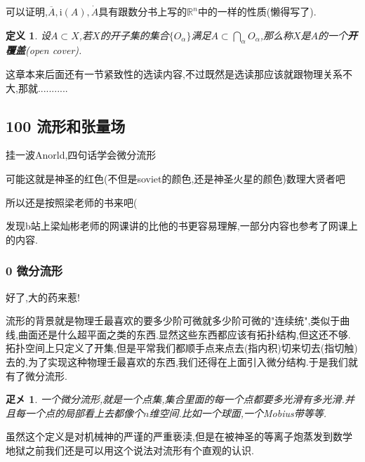 \documentclass[UTF8]{article}
\newcommand{\im}{\mathrm{i}}
\begin{document}
	可以证明,$\overline{A}, \im(A), \dot{A}$具有跟数分书上写的$\mathbb{R}^n$中的一样的性质(懒得写了).
	
	\newtheorem*{openCover}{定义}
	
	\begin{openCover}
		设$A \subset X$,若$X$的开子集的集合$\{O_{\alpha}\}$满足$A \subset \bigcap_{\alpha} O_{\alpha}$,那么称$X$是$A$的一个\textbf{开覆盖}(open cover).
	\end{openCover}
	
	这章本来后面还有一节紧致性的选读内容,不过既然是选读那应该就跟物理关系不大,那就...........
	
	
	\newpage	
	
	
	
	
	
	
\subsection*{100 流形和张量场}
	
	挂一波Anorld,\quad 四\quad 句\quad 话\quad 学\quad 会\quad 微\quad 分\quad 流\quad 形
	
	可能这就是神圣的红色(不但是soviet的颜色,还是神圣火星的颜色)数理大贤者吧
	
	所以还是按照梁老师的书来吧(
	
	发现b站上梁灿彬老师的网课讲的比他的书更容易理解,一部分内容也参考了网课上的内容.
	
\subsubsection*{0 微分流形}
	
	好了,大\quad 的\quad 药\quad 来\quad 惹\quad !
	
	流形的背景就是物理壬最喜欢的要多少阶可微就多少阶可微的"连续统",类似于曲线,曲面还是什么超平面之类的东西.显然这些东西都应该有拓扑结构,但这还不够.拓扑空间上只定义了开集,但是平常我们都顺手点来点去(指内积)切来切去(指切触)去的,为了实现这种物理壬最喜欢的东西,我们还得在上面引入微分结构.于是我们就有了微分流形.
	
	\newtheorem*{easyManifold}{疋㐅\cite{Hassani}}
	
	\begin{easyManifold}
		一个微分流形,就是一个点集,集合里面的每一个点都要多光滑有多光滑.并且每一个点的局部看上去都像个$n$维空间.比如一个球面,一个Mobius带等等.
	\end{easyManifold}
	
	虽然这个定义是对机械神的严谨的严重亵渎,但是在被神圣的等离子炮蒸发到数学地狱之前我们还是可以用这个说法对流形有个直观的认识.
	
\end{document}
